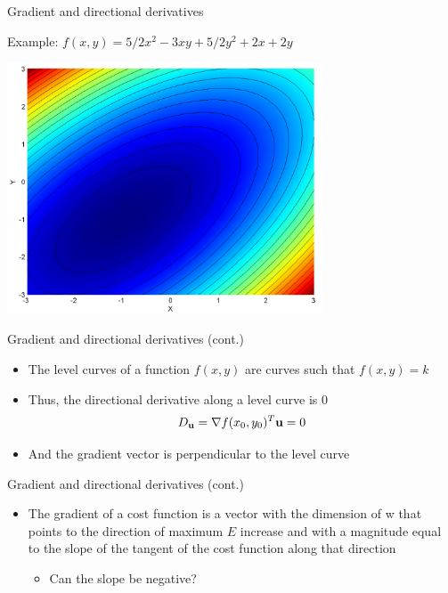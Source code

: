 \documentclass[notes]{beamer}
\providecommand{\tightlist}{%
  \setlength{\itemsep}{0pt}\setlength{\parskip}{0pt}}
\begin{document}
\begin{frame}{Gradient and directional derivatives}

Example: \(f(x,y)=5/2 x^2 -3xy + 5/2 y^2 +2x +2y\)

\centering 

\includegraphics[width=0.70000\textwidth]{2018-03-09-22-34-05.png}\\

\end{frame}

\begin{frame}{Gradient and directional derivatives (cont.)}

\begin{itemize}
\tightlist
\item
  The level curves of a function \(f(x,y)\) are curves such that
  \(f(x,y)=k\)
\item
  Thus, the directional derivative along a level curve is 0
  \[D_{\mathbf{u}} = \nabla f(x_0,y_0) ^T \mathbf{u} = 0 \]
\item
  And the gradient vector is perpendicular to the level curve
\end{itemize}

\end{frame}

\begin{frame}{Gradient and directional derivatives (cont.)}

\begin{itemize}
\tightlist
\item
  The gradient of a cost function is a vector with the dimension of w
  that points to the direction of maximum \(E\) increase and with a
  magnitude equal to the slope of the tangent of the cost function along
  that direction

  \begin{itemize}
  \tightlist
  \item
    Can the slope be negative?
  \end{itemize}
\end{itemize}

\end{frame}
\end{document}
